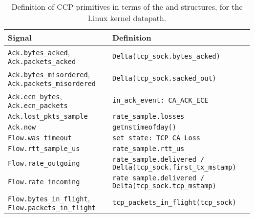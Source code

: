 \begin{table}
    \centering
    \footnotesize
    \begin{tabular}{p{}p{}}
        \textbf{Signal} & \textbf{Definition} \\
        \hline
        \texttt{Ack.bytes\_acked}, \texttt{Ack.packets\_acked}             & \texttt{Delta(tcp\_sock.bytes\_acked)} \\
        \texttt{Ack.bytes\_misordered}, \texttt{Ack.packets\_misordered}   & \texttt{Delta(tcp\_sock.sacked\_out)} \\
        \texttt{Ack.ecn\_bytes}, \texttt{Ack.ecn\_packets}                 & \texttt{in\_ack\_event: CA\_ACK\_ECE} \\
        \texttt{Ack.lost\_pkts\_sample}                                    & \texttt{rate\_sample.losses} \\
        \texttt{Ack.now}                                                   & \texttt{getnstimeofday()}\\
        \texttt{Flow.was\_timeout}                                         & \texttt{set\_state: TCP\_CA\_Loss} \\
        \texttt{Flow.rtt\_sample\_us}                                      & \texttt{rate\_sample.rtt\_us} \\
        \texttt{Flow.rate\_outgoing}                                       & \texttt{rate\_sample.delivered / Delta(tcp\_sock.first\_tx\_mstamp)} \\
        \texttt{Flow.rate\_incoming}                                       & \texttt{rate\_sample.delivered / Delta(tcp\_sock.tcp\_mstamp)}  \\
        \texttt{Flow.bytes\_in\_flight}, \texttt{Flow.packets\_in\_flight} & \texttt{tcp\_packets\_in\_flight(tcp\_sock)} \\
    \end{tabular}
    \caption{Definition of CCP primitives in terms of the  and  structures, for the Linux kernel datapath.}\label{tab:api:kernel}
\end{table}

%



